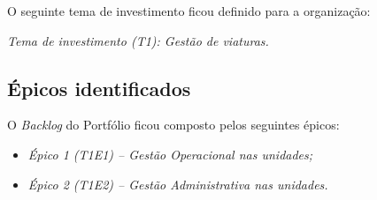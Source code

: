      O seguinte tema de investimento ficou definido para a organização:
      
      \emph{Tema de investimento (T1): Gestão de viaturas.}
    
    \subsection{Épicos identificados}
      
      O \textit{Backlog} do Portfólio ficou composto pelos seguintes épicos:
      
      \begin{itemize}
      \item \emph{Épico 1 (T1E1) – Gestão Operacional nas unidades;}
      \item \emph{Épico 2 (T1E2) – Gestão Administrativa nas unidades.}
      \end{itemize}

    